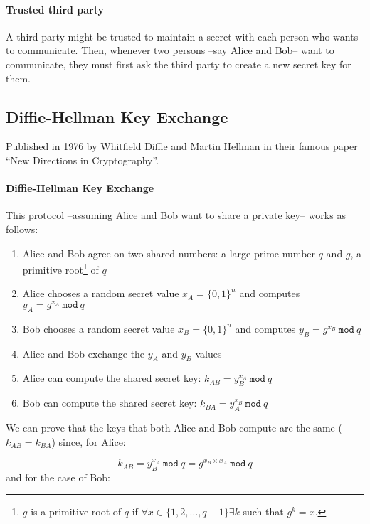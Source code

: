 \documentclass[12pt, letterpaper]{article}
\begin{document}
\paragraph{Trusted third party} A third party might be trusted to maintain a secret with each person who wants to communicate.
Then, whenever two persons --say Alice and Bob-- want to communicate, they must first ask the third party to create a new secret key for them.

\subsection{Diffie-Hellman Key Exchange}

Published in 1976 by Whitfield Diffie and Martin Hellman in their famous paper ``New Directions in Cryptography''.

\paragraph{Diffie-Hellman Key Exchange} This protocol --assuming Alice and Bob want to share a private key-- works as follows:

\begin{enumerate}
  \item Alice and Bob agree on two shared numbers: a large prime number $q$ and $g$, a primitive root\footnote{$g$ is a primitive root of $q$ if $\forall x \in \lbrace 1, 2, \dots, q-1\rbrace \exists k$ such that $g^k = x$.} of $q$
  \item Alice chooses a random secret value $x_A = \lbrace 0, 1 \rbrace^n$ and computes $y_A = g^{x_A} \: \mathtt{mod} \: q$
  \item Bob chooses a random secret value $x_B = \lbrace 0, 1 \rbrace^n$ and computes $y_B = g^{x_B} \: \mathtt{mod} \: q$
  \item Alice and Bob exchange the $y_A$ and $y_B$ values
  \item Alice can compute the shared secret key: $k_{AB} = y_B^{x_A} \: \mathtt{mod} \: q$
  \item Bob can compute the shared secret key: $k_{BA} = y_A^{x_B} \: \mathtt{mod} \: q$
\end{enumerate}

We can prove that the keys that both Alice and Bob compute are the same ($k_{AB} = k_{BA}$) since, for Alice:

\[
  k_{AB} = y_B^{x_A} \: \mathtt{mod} \: q = g^{x_B \times x_A} \: \mathtt{mod} \: q
\]
and for the case of Bob:
\end{document}
